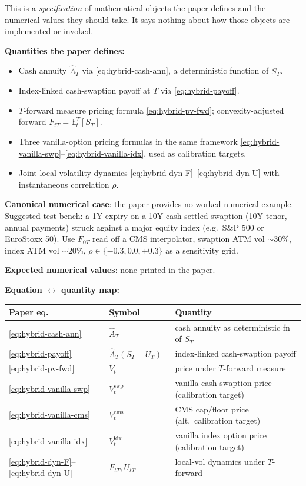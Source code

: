 \documentclass[11pt,a4paper]{article}
\begin{document}
\begin{validation}
This is a \emph{specification} of mathematical objects the paper
defines and the numerical values they should take. It says nothing
about how those objects are implemented or invoked.

\textbf{Quantities the paper defines:}
\begin{itemize}[noitemsep]
  \item Cash annuity $\widehat A_T$ via \eqref{eq:hybrid-cash-ann},
        a deterministic function of $S_T$.
  \item Index-linked cash-swaption payoff at $T$ via
        \eqref{eq:hybrid-payoff}.
  \item $T$-forward measure pricing formula
        \eqref{eq:hybrid-pv-fwd}; convexity-adjusted forward
        $F_{tT} = \mathbb{E}^T_t[S_T]$.
  \item Three vanilla-option pricing formulas in the same framework
        \eqref{eq:hybrid-vanilla-swp}--\eqref{eq:hybrid-vanilla-idx},
        used as calibration targets.
  \item Joint local-volatility dynamics
        \eqref{eq:hybrid-dyn-F}--\eqref{eq:hybrid-dyn-U} with
        instantaneous correlation $\rho$.
\end{itemize}

\textbf{Canonical numerical case}: the paper provides no worked
numerical example. Suggested test bench: a 1Y expiry on a 10Y
cash-settled swaption (10Y tenor, annual payments) struck against a
major equity index (e.g.\ S\&P 500 or EuroStoxx 50). Use $F_{0T}$
read off a CMS interpolator, swaption ATM vol $\sim 30\%$, index ATM
vol $\sim 20\%$, $\rho \in \{-0.3, 0.0, +0.3\}$ as a sensitivity grid.

\textbf{Expected numerical values}: none printed in the paper.

\textbf{Equation $\leftrightarrow$ quantity map:}

\smallskip
\begin{tabular}{@{}p{2.8cm}p{3.8cm}p{6.2cm}@{}}
\toprule
Paper eq.                          & Symbol                  & Quantity \\
\midrule
\eqref{eq:hybrid-cash-ann}         & $\widehat A_T$          & cash annuity as deterministic fn of $S_T$ \\
\eqref{eq:hybrid-payoff}           & $\widehat A_T (S_T - U_T)^+$ & index-linked cash-swaption payoff \\
\eqref{eq:hybrid-pv-fwd}           & $V_t$                   & price under $T$-forward measure \\
\eqref{eq:hybrid-vanilla-swp}      & $V^{\text{swp}}_t$      & vanilla cash-swaption price (calibration target) \\
\eqref{eq:hybrid-vanilla-cms}      & $V^{\text{cms}}_t$      & CMS cap/floor price (alt.\ calibration target) \\
\eqref{eq:hybrid-vanilla-idx}      & $V^{\text{idx}}_t$      & vanilla index option price (calibration target) \\
\eqref{eq:hybrid-dyn-F}--\eqref{eq:hybrid-dyn-U} & $F_{tT}, U_{tT}$ & local-vol dynamics under $T$-forward \\
\bottomrule
\end{tabular}
\smallskip


\end{validation}
\end{document}
